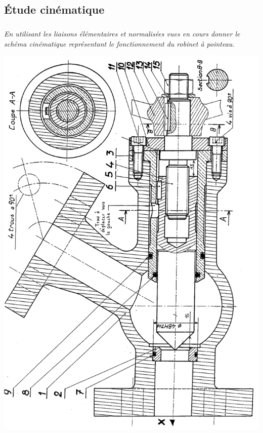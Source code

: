 \documentclass[10pt,fleqn]{article} %
\begin{document}
\begin{multicols}{2}
\subsection*{Étude cinématique}
\subparagraph{}\textit{En utilisant les liaisons élémentaires et normalisées vues en cours donner le schéma cinématique représentant le fonctionnement du robinet à pointeau.}

\end{multicols}


\begin{center}
\includegraphics[width=\linewidth]{images/plan_robinet}
\end{center}
\end{document}
